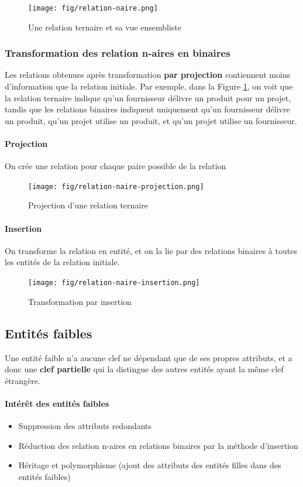 \documentclass[a4paper]{article}
\begin{document}
\begin{figure}[H]
    \center
    \texttt{[image: fig/relation-naire.png]}
    \caption{Une relation ternaire et sa vue ensembliste}
\end{figure}

\subsubsection{Transformation des relation n-aires en binaires}
Les relations obtenues après transformation \textbf{par projection} contiennent moins d'information
que la relation initiale. Par exemple, dans la Figure \ref{fig:relation-naire-projection},
on voit que la relation ternaire indique qu'un fournisseur délivre un produit pour un projet,
tandis que les relations binaires indiquent uniquement qu'un fournisseur délivre un produit,
qu'un projet utilise un produit, et qu'un projet utilise un fournisseur.

\paragraph{Projection}
On crée une relation pour chaque paire possible de la relation
\begin{figure}[H]
    \center
    \texttt{[image: fig/relation-naire-projection.png]}
    \caption{\label{fig:relation-naire-projection}Projection d'une relation ternaire}
\end{figure}

\paragraph{Insertion}
On transforme la relation en entité, et on la lie par des relations binaires à
toutes les entités de la relation initiale.
\begin{figure}[H]
    \center
    \texttt{[image: fig/relation-naire-insertion.png]}
    \caption{Transformation par insertion}
\end{figure}

\subsection{Entités faibles}
Une entité faible n'a aucune clef ne dépendant que de ses propres attributs, et
a donc une \textbf{clef partielle} qui la distingue des autres entités ayant la
même clef étrangère.

\paragraph{Intérêt des entités faibles}
\begin{itemize}
  \item Suppression des attributs redondants
  \item Réduction des relation n-aires en relations binaires par la méthode d'insertion
  \item Héritage et polymorphisme (ajout des attributs des entités filles dans des entités faibles)
\end{itemize}
\end{document}
